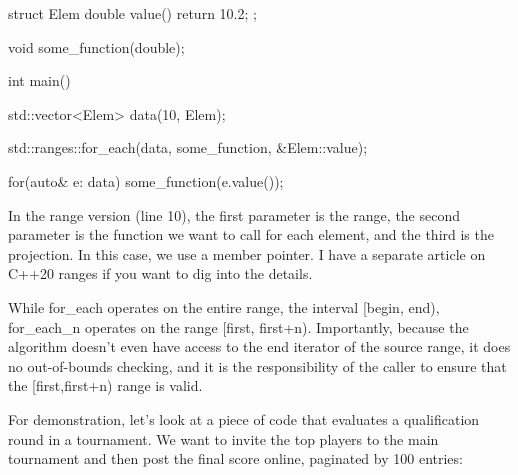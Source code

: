 \begin{box-note}
\begin{cppcode}
struct Elem {
    double value() { return 10.2; }
};

void some_function(double);

int main() {
    std::vector<Elem> data(10, Elem{});
    
    std::ranges::for_each(data, some_function, &Elem::value);

    for(auto& e: data) {
        some_function(e.value());
    }
}
\end{cppcode}
\end{box-note}

In the range version (line 10), the first parameter is the range, the second parameter is the function we want to call for each element, and the third is the projection. In this case, we use a member pointer. I have a separate article on C++20 ranges if you want to dig into the details.


While for\_each operates on the entire range, the interval [begin, end), for\_each\_n operates on the range [first, first+n). Importantly, because the algorithm doesn’t even have access to the end iterator of the source range, it does no out-of-bounds checking, and it is the responsibility of the caller to ensure that the [first,first+n) range is valid.

For demonstration, let’s look at a piece of code that evaluates a qualification round in a tournament. We want to invite the top players to the main tournament and then post the final score online, paginated by 100 entries:

